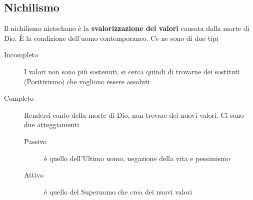 \subsection{Nichilismo}
Il nichilismo nietschano è la \textbf{svalorizzazione dei valori} causata dalla morte di Dio. È la
condizione dell'uomo contemporaneo. Ce ne sono di due tipi
\begin{description}
  \item[Incompleto] I valori non sono più sostenuti, si cerca quindi di trovarne dei sostituti 
    (Positivismo) che vogliono essere assoluti
  \item[Completo] Rendersi conto della morte di Dio, non trovare dei nuovi valori. Ci sono due 
    atteggiamenti
    \begin{description}
      \item[Passivo] è quello dell'Ultimo uomo, negazione della vita e pessimismo
      \item[Attivo] è quello del Superuomo che crea dei nuovi valori
    \end{description}
\end{description}
